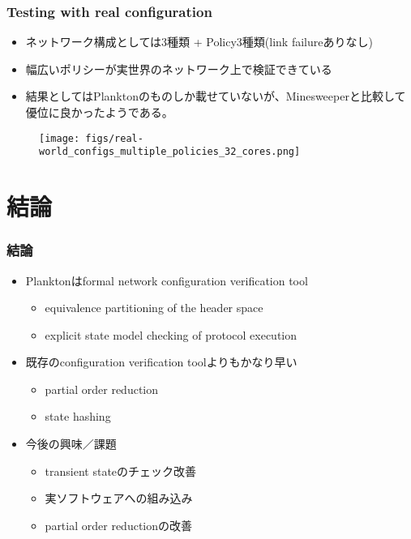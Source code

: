 \documentclass[dvipdfmx,9pt,notheorems]{beamer}
\theoremstyle{definition}
\begin{document}
\begin{frame}\frametitle{Testing with real configuration}
\begin{itemize}
	\item ネットワーク構成としては3種類 + Policy3種類(link failureありなし)
	\item 幅広いポリシーが実世界のネットワーク上で検証できている
	\item 結果としてはPlanktonのものしか載せていないが、Minesweeperと比較して優位に良かったようである。
\end{itemize}
\begin{figure}[htb]
  \centering
	\texttt{[image: figs/real-world\_configs\_multiple\_policies\_32\_cores.png]}
\end{figure}%
\end{frame}



\section{結論}
\begin{frame}\frametitle{結論}
	\begin{itemize}
		\item Planktonは{\color{orange}formal} network configuration verification tool
		\begin{itemize}
			\item equivalence partitioning of the header space
			\item explicit state model checking of protocol execution
		\end{itemize}
		\item 既存のconfiguration verification toolよりもかなり早い
		\begin{itemize}
			\item partial order reduction
			\item state hashing
		\end{itemize}
		\item 今後の興味／課題
		\begin{itemize}
			\item transient stateのチェック改善
			\item 実ソフトウェアへの組み込み
			\item partial order reductionの改善
		\end{itemize}
	\end{itemize}
	\pnote{
	}
\end{frame}
\end{document}
